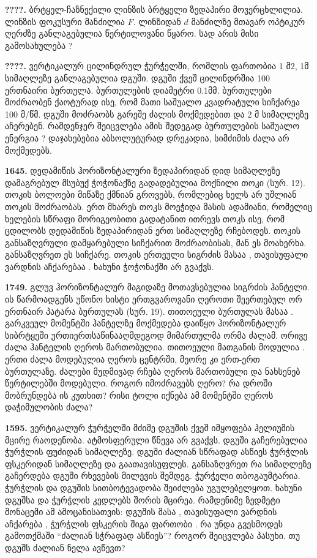 \documentclass[12pt,a4paper,]{report}
\begin{document}
\textbf{????.} ბრტყელ-ჩაზნექილი ლინზის ბრტყელი ზედაპირი მოვერცხლილია. ლინზის ფოკუსური მანძილია $F$. ლინზიდან $d$ მანძილზე მთავარ ოპტიკურ ღერძზე განლაგებულია წერტილოვანი წყარო. სად არის მისი გამოსახულება ? 

\textbf{????.} ვერტიკალურ ცილინდრულ ჭურჭელში, რომლის ფართობია 1 მ2, 1მ სიმაღლეზე განლაგებულია დგუში. დგუში ქვეშ ცილინდრშია 100 ერთნაირი ბურთულა. ბურთულების დიამეტრი 0.1მმ. ბურთულები მოძრაობენ ქაოტურად ისე, რომ მათი საშუალო კვადრატული სიჩქარეა 100 მ/წმ. დგუში მოძრაობს გარეშე ძალის მოქმედებით და 2 მ სიმაღლეზე აჩერებენ. რამდენჯერ შეიცვლება ამის შედეგად ბურთულების საშუალო ენერგია ? დაჯახებებია აბსოლუტურად დრეკადია, სიმძიმის ძალა არ მოქმედებს. 

\textbf{1645.} დედამიწის ჰორიზონტალური ზედაპირიდან დიდ   სიმაღლეზე დამაგრებულ მსუბუქ ჭოჭონაქზე გადადებულია მოქნილი თოკი (სურ. 12). თოკის ბოლოები მიწაზე ქმნიან გროვებს, რომლებიც ხელს არ უშლიან თოკის მოძრაობას. ერთ მხარეს თოკს მოეჭიდა   მასის ადამიანი, რომელიც  ხელების სწრაფი მორიგეობითი  გადატანით ითრევს თოკს ისე, რომ ცდილობს დედამიწის ზედაპირიდან ერთ სიმაღლეზე რჩებოდეს. თოკის განსაზღვრული დამყარებული სიჩქარით მოძრაობისას, მან ეს მოახერხა. განსაზღვრეთ ეს სიჩქარე. თოკის ერთეული სიგრძის მასაა  , თავისუფალი ვარდნის აჩქარებაა  . ხახუნი ჭოჭონაქში არ გვაქვს.                                                                                                             

\textbf{1749.} გლუვ ჰორიზონტალურ მაგიდაზე მოთავსებულია   სიგრძის ჰანტელი. ის წარმოადგენს უწონო ხისტი ერთგვაროვანი ღეროთი შეერთებულ ორ ერთნაირ პატარა ბურთულას (სურ. 19). თითოეული ბურთულას მასაა  . გარკვეულ მომენტში ჰანტელზე მოქმედება დაიწყო ჰორიზონტალურ სიბრტყეში ურთიერთსაწინააღმდეგოდ მიმართულმა ორმა ძალამ. ორივე ძალა ჰანტელის ღეროს მართობულია. თითოეული მათგანის მოდულია  . ერთი ძალა მოდებულია ღეროს ცენტრში, მეორე კი ერთ-ერთ ბურთულაზე. ძალები მუდმივად რჩება ღეროს მართობული და ნახსენებ წერტილებში მოდებული. როგორ იმოძრავებს ღერო? რა დროში მობრუნდება ის   კუთხით? რისი ტოლი იქნება ამ მომენტში ღეროს დაჭიმულობის ძალა?                                              

\textbf{1595.} ვერტიკალურ ჭურჭელში მძიმე დგუშის ქვეშ იმყოფება ჰელიუმის მცირე რაოდენობა. ატმოსფერული წნევა არ გვაქვს. დგუში გაჩერებულია ჭურჭლის ფუძიდან   სიმაღლეზე. დგუში ძალიან სწრაფად ასწიეს ჭურჭლის ფსკერიდან   სიმაღლეზე და გაათავისუფლეს. განსაზღვრეთ რა სიმაღლეზე გაჩერდება დგუში რხევების მილევის შემდეგ. ჭურჭელი თბოგაუმტარია. ჭურჭლის და დგუშის სითბოტევადობა შეიძლება უგულებელყოთ. ხახუნი დგუშსა და ჭურჭლის კედლებს შორის მცირეა. რამდენიმე ზედმეტი მონაცემი ამ ამოცანისათვის: დგუშის მასა  , თავისუფალი ვარდნის აჩქარება  , ჭურჭლის ფსკერის შიგა ფართობი  . რა უნდა გვესმოდეს გამოთქმაში “ძალიან სჭრაფად ასწიეს”? როგორ შეიცვლება პასუხი. თუ დგუშს ძალიან ნელა ავწევთ?
\end{document}
